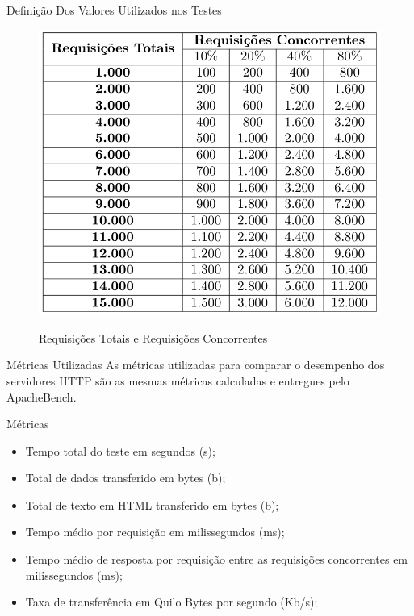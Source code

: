 \begin{frame}{Definição Dos Valores Utilizados nos Testes}
	\begin{figure}
		\centering
		\caption{Requisições Totais e Requisições Concorrentes}
		\includegraphics[width=0.7\linewidth]{tabela-requisicoes} \\
	\end{figure}
\end{frame}

\begin{frame}{Métricas Utilizadas}
As métricas utilizadas para comparar o desempenho dos servidores HTTP são as 
mesmas métricas calculadas e entregues pelo ApacheBench.
\begin{block}{Métricas}
\begin{itemize}
	\item Tempo total do teste em segundos (s);
	\item Total de dados transferido em bytes (b);
	\item Total de texto em HTML transferido em bytes (b);
	\item Tempo médio por requisição em milissegundos (ms);
	\item Tempo médio de resposta por requisição entre as requisições 
	concorrentes em milissegundos (ms);
	\item Taxa de transferência em Quilo Bytes por segundo (Kb/s);
\end{itemize}
\end{block}
\end{frame}





